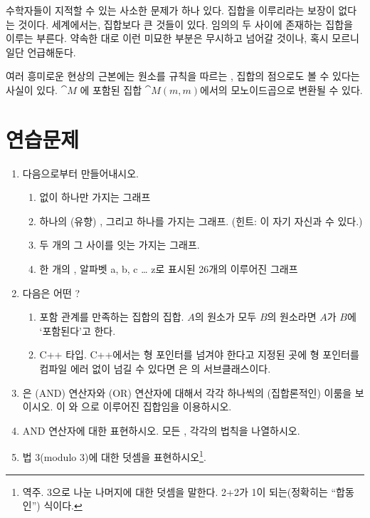 \noindent
수학자들이 지적할 수 있는 사소한 문제가 하나 있다.  집합을 이루리라는 보장이 없다는 것이다.
 세계에서는, 집합보다 큰 것들이 있다. 임의의 두 \trObject 사이에 존재하는 \trMorphism\이 집합을 이루는 \trCategory\는  부른다.
약속한 대로 이런 미묘한 부분은 무시하고 넘어갈 것이나, 혹시 모르니 일단 언급해둔다.

 여러 흥미로운 현상의 근본에는  원소를  규칙을 따르는 \trMorphism{}, 집합의 점으로도 볼 수 있다는 사실이 있다.
$\cat{M}$ 에 포함된  \trComposition\은 집합 $\cat{M}(m, m)$에서의 모노이드곱으로 변환될 수 있다.

\section{연습문제}

\begin{enumerate}
\tightlist
\item
  다음으로부터 \trFreeCategory\를 만들어내시오.  

  \begin{enumerate}
  \tightlist
  \item
    \trEdge 없이 \trNode 하나만 가지는 그래프
  \item
    하나의 (유향) \trEdge, 그리고 \trNode 하나를 가지는 그래프.
    (힌트: 이 \trEdge\은 자기 자신과  수 있다.)
  \item
    두 개의 \trNode\과 그 사이를 잇는 \trArrow\를 가지는 그래프.
  \item
    한 개의 \trNode\과, 알파벳 a, b, c \ldots{} z로 표시된 26개의 \trArrow\로 이루어진 그래프
  \end{enumerate}
\item
  다음은 어떤 ?

  \begin{enumerate}
  \tightlist
  \item
    포함 관계를 만족하는 집합의 집합. $A$의 원소가 모두 $B$의 원소라면 $A$가 $B$에 `포함된다'고 한다. 
  \item
    C++ 타입. C++에서는 형 포인터를 넘겨야 한다고 지정된 곳에 형 포인터를 컴파일 에러 없이 넘길 수 있다면 
    은 의 서브클래스이다.
  \end{enumerate}
\item
  은 \code{\&\&} (AND) 연산자와 \code{||} (OR) 연산자에 대해서 각각 하나씩의 (집합론적인) \trMonoid\를 이룸을 보이시오.
  이 와 으로 이루어진 집합임을 이용하시오.
\item
  AND 연산자에 대한  \trMonoid\를 \trCategory{} 표현하시오. 모든 \trMorphism, 각각의 \trComposition 법칙을 나열하시오.
\item
  법 3(modulo 3)에 대한 덧셈을 \trMonoid \trCategory\로 표현하시오\footnote{역주. 3으로 나눈 나머지에 대한 덧셈을 말한다. 2+2가 1이 되는(정확히는 ``합동인'') 식이다. }. 
\end{enumerate}